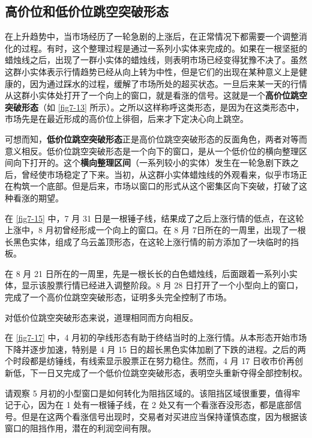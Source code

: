 \subsection{高价位和低价位跳空突破形态\label{subsection7-2-1}}
在上升趋势中，当市场经历了一轮急剧的上涨后，在正常情况下都需要一个调整消化的过程。有时，这个整理过程是通过一系列小实体来完成的。如果在一根坚挺的蜡烛线之后，出现了一群小实体的蜡烛线，则表明市场已经变得犹豫不决了。虽然这群小实体表示行情趋势已经从向上转为中性，但是它们的出现在某种意义上是健康的，因为通过踩水的过程，缓解了市场所处的超买状态。一旦后来某一天的行情从这群小实体处打开了一个向上的窗口，就是看涨的信号。这就是一个\textbf{高价位跳空突破形态}（如 \autoref{fig7-13} 所示）。之所以这样称呼这类形态，是因为在这类形态中，市场先是在最近形成的高价位上徘徊，后来才下定决心向上跳空。

可想而知，\textbf{低价位跳空突破形态}正是高价位跳空突破形态的反面角色，两者对等而意义相反。低价位跳空突破形态是一个向下的窗口，是从一个低价位的横向整理区间向下打开的。这个\textbf{横向整理区间}（一系列较小的实体）发生在一轮急剧下跌之后，曾经使市场稳定了下来。当初，从这群小实体蜡烛线的外观看来，似乎市场正在构筑一个底部。但是后来，市场以窗口的形式从这个密集区向下突破，打破了这种看涨的期望。

在 \autoref{fig7-15} 中，7 月 31 日是一根锤子线，结果成了之后上涨行情的低点，在这轮上涨中，8 月初曾经形成一个向上的窗口。在 8 月 7日所在的一周里，出现了一根长黑色实体，组成了乌云盖顶形态，在这轮上涨行情的前方添加了一块临时的挡板。

在 8 月 21 日所在的一周里，先是一根长长的白色蜡烛线，后面跟着一系列小实体，显示该股票行情已经进入调整阶段。8 月 28 日打开了一个小型向上的窗口，完成了一个高价位跳空突破形态，证明多头完全控制了市场。

对低价位跳空突破形态来说，道理相同而方向相反。

在 \autoref{fig7-17} 中，4 月初的孕线形态有助于终结当时的上涨行情。从本形态开始市场下降并逐步加速，特别是 4 月 15 日的超长黑色实体加剧了下跌的进程。之后的两个时段都是纺锤线，有线索显示股票正在努力稳住。然而，4 月 17 日收市价再创新低，下一日又完成了一个低价位跳空突破形态，表明空头重新夺得全部控制权。

请观察 5 月初的小型窗口是如何转化为阻挡区域的。该阻挡区域很重要，值得牢记于心，因为在 1 处有一根锤子线，在 2 处又有一个看涨吞没形态，都是底部信号。但是在这两个看涨信号出现时，交易者对买进应当保持谨慎态度，因为根据该窗口的阻挡作用，潜在的利润空间有限。
